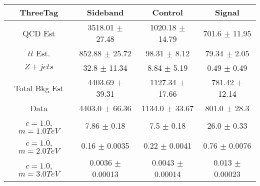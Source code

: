 \begin{footnotesize} 
\begin{tabular}{c|c|c|c} 
ThreeTag & Sideband & Control & Signal \\ 
\hline\hline 
QCD Est & 3518.01 $\pm$ 27.48 & 1020.18 $\pm$ 14.79 & 701.6 $\pm$ 11.95\\ 
$t\bar{t}$ Est.  & 852.88 $\pm$ 25.72 & 98.31 $\pm$ 8.12 & 79.34 $\pm$ 2.05\\ 
$Z+jets$ & 32.8 $\pm$ 11.34 & 8.84 $\pm$ 5.19 & 0.49 $\pm$ 0.49\\ 
Total Bkg Est & 4403.69 $\pm$ 39.31 & 1127.34 $\pm$ 17.66 & 781.42 $\pm$ 12.14\\ 
Data & 4403.0 $\pm$ 66.36 & 1134.0 $\pm$ 33.67 & 801.0 $\pm$ 28.3\\ 
$c=1.0$,$m=1.0TeV$ & 7.86 $\pm$ 0.18 & 7.5 $\pm$ 0.18 & 26.0 $\pm$ 0.33\\ 
$c=1.0$,$m=2.0TeV$ & 0.16 $\pm$ 0.0035 & 0.22 $\pm$ 0.0041 & 0.76 $\pm$ 0.0076\\ 
$c=1.0$,$m=3.0TeV$ & 0.0036 $\pm$ 0.00013 & 0.0043 $\pm$ 0.00014 & 0.013 $\pm$ 0.00023\\ 
\hline\hline 
\end{tabular} 
\end{footnotesize} 
\newline 
